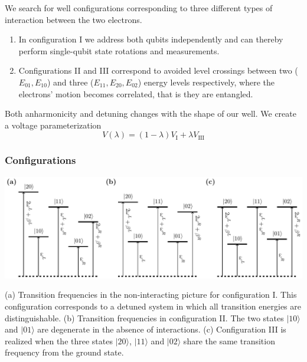 \documentclass{beamer}
\begin{document}
\begin{frame}
We search for well configurations corresponding to three different types of interaction between the two electrons.

\begin{enumerate}
\item In configuration I we address both qubits independently and can thereby perform single-qubit state rotations and measurements.

\item Configurations II and III correspond to avoided level crossings between two ($E_{01}, E_{10}$) and three ($E_{11}, E_{20}, E_{02}$) energy levels respectively, where the electrons' motion becomes correlated, that is they are entangled. 
\end{enumerate}

\noindent
Both anharmonicity and detuning changes with the shape of our well.
We create a voltage parameterization
\begin{equation}
V(\lambda) = (1-\lambda)V_\mathrm{I} + \lambda V_\mathrm{III}
\end{equation}
\end{frame}

\begin{frame}
\frametitle{Configurations}
\centerline{\includegraphics[width=0.8\linewidth]{qcfigures/states.pdf}}
(a) Transition frequencies in the non-interacting picture for configuration I. This configuration corresponds to a detuned
system in which all transition energies are distinguishable. (b) Transition
frequencies in configuration II. The two states $\vert 10\rangle$ and $\vert 01\rangle$ are degenerate in the
absence of interactions. (c)
Configuration III is realized when the three states $\vert 20\rangle$, $\vert 11\rangle$ and $\vert 02\rangle$ share the same transition frequency from the ground
state. 
\end{frame}
\end{document}
